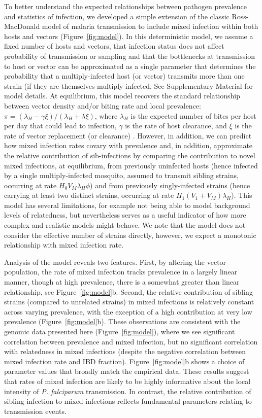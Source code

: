 \documentclass[9pt,lineno]{elife}
\begin{document}
To better understand the expected relationships between pathogen prevalence and statistics of infection, we developed a simple extension of the classic Ross-MacDonald model \citep{Smith2012} of malaria transmission to include mixed infection within both hosts and vectors (Figure~\ref{fig:model}). In this deterministic model, we assume a fixed number of hosts and vectors, that infection status does not affect probability of transmission or sampling and that the bottlenecks at transmission to host or vector can be approximated as a single parameter that determines the probability that a multiply-infected host (or vector) transmits more than one strain (if they are themselves multiply-infected.  See Supplementary Material for model details.  At equilibrium, this model recovers the standard relationship between vector density and/or biting rate and local prevalence: $\pi = (\lambda_H - \gamma \xi)/(\lambda_H + \lambda \xi)$, where $\lambda_H$ is the expected number of bites per host per day that could lead to infection, $\gamma$ is the rate of host clearance, and $\xi$ is the rate of vector replacement (or clearance) .  However, in addition, we  can predict how mixed infection rates covary with prevalence and, in addition, approximate the relative contribution of sib-infections by comparing the contribution to novel mixed infections, at equilibrium, from previously uninfected hosts (hence infected by a single multiply-infected mosquito, assumed to transmit sibling strains, occurring at rate $H_0 V_M \lambda_H \phi$) and from previously singly-infected strains (hence carrying at least two distinct strains, occurring at rate $H_1 (V_1 + V_M) \lambda_H$).  This model has several limitations, for example not being able to model background levels of relatedness, but nevertheless serves as a useful indicator of how more complex and realistic models might behave.  We note that the model does not consider the effective number of strains directly, however, we expect a monotonic relationship with mixed infection rate.

Analysis of the model reveals two features.  First, by altering the vector population, the rate of mixed infection tracks prevalence in a largely linear manner, though at high prevalence, there is a somewhat greater than linear relationship, see Figure~\ref{fig:model}b.  Second, the relative contribution of sibling strains (compared to unrelated strains) in mixed infections is relatively constant across varying prevalence, with the exception of a  high contribution at very low prevalence (Figure~\ref{fig:model}b).  These observations are consistent with the genomic data presented here (Figure~\ref{fig:model}), where we see significant correlation between prevalence and mixed infection, but no significant correlation with relatedness in mixed infections (despite the negative correlation between mixed infection rate and IBD fraction).  Figure~\ref{fig:model}b shows a choice of parameter values that broadly match the empirical data.  These results suggest that rates of mixed infection are likely to be highly informative about the local intensity of {\it P. falciparum} transmission.  In contrast, the relative contribution of sibling infection to mixed infections reflects fundamental parameters relating to transmission events.
\end{document}

